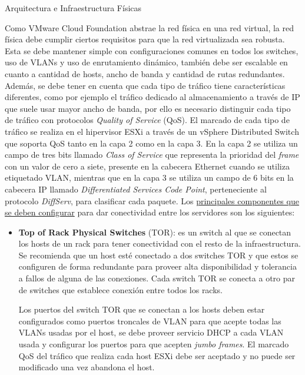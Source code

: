 \begin{subsection}{Arquitectura e Infraestructura Físicas \cite{CFfisInfraestuctura}}

Como VMware Cloud Foundation abstrae la red física en una red virtual, la red física debe cumplir ciertos requisitos para que la red virtualizada sea robusta. Esta se debe mantener simple con configuraciones comunes en todos los switches, uso de VLANs y uso de enrutamiento dinámico, también debe ser escalable en cuanto a cantidad de hosts, ancho de banda y cantidad de rutas redundantes. Además, se debe tener en cuenta que cada tipo de tráfico tiene características diferentes, como por ejemplo el tráfico dedicado al almacenamiento a través de IP que suele usar mayor ancho de banda, por ello es necesario distinguir cada tipo de tráfico con protocolos \textit{Quality of Service} (QoS). El marcado de cada tipo de tráfico se realiza en el hipervisor ESXi a través de un vSphere Distributed Switch que soporta QoS tanto en la capa 2 como en la capa 3. En la capa 2 se utiliza  un campo de tres bits llamado \textit{Class of Service} que representa la prioridad del \textit{frame} con un valor de cero a siete, presente en la cabecera Ethernet cuando se utiliza etiquetado VLAN, mientras que en la capa 3 se utiliza un campo de 6 bits en la cabecera IP llamado \textit{Differentiated Services Code Point}, perteneciente al protocolo \textit{DiffServ}, para clasificar cada paquete. Los \underline{principales componentes que se deben configurar} para dar conectividad entre los servidores son los siguientes:
\begin{itemize}
    \item \textbf{Top of Rack Physical Switches} (TOR): es un switch al que se conectan los hosts de un rack para tener conectividad con el resto de la infraestructura. Se recomienda que un host esté conectado a dos switches TOR y que estos se configuren de forma redundante para proveer alta disponibilidad y tolerancia a fallos de alguna de las conexiones. Cada switch TOR se conecta a otro par de switches que establece conexión entre todos los racks.
    
    Los puertos del switch TOR que se conectan a los hosts deben estar configurados como puertos troncales de VLAN para que acepte todas las VLANs usadas por el host, se debe proveer servicio DHCP a cada VLAN usada y configurar los puertos para que acepten \textit{jumbo frames}. El marcado QoS del tráfico que realiza cada host ESXi debe ser aceptado y no puede ser modificado una vez abandona el host. 
    

\end{itemize}
\end{subsection}

